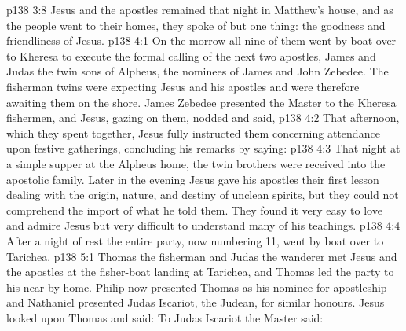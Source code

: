 \vs p138 3:8 Jesus and the apostles remained that night in Matthew’s house, and as the people went to their homes, they spoke of but one thing: the goodness and friendliness of Jesus.
\vs p138 4:1 On the morrow all nine of them went by boat over to Kheresa to execute the formal calling of the next two apostles, James and Judas the twin sons of Alpheus, the nominees of James and John Zebedee. The fisherman twins were expecting Jesus and his apostles and were therefore awaiting them on the shore. James Zebedee presented the Master to the Kheresa fishermen, and Jesus, gazing on them, nodded and said, 
\vs p138 4:2 \pc That afternoon, which they spent together, Jesus fully instructed them concerning attendance upon festive gatherings, concluding his remarks by saying: 
\vs p138 4:3 \pc That night at a simple supper at the Alpheus home, the twin brothers were received into the apostolic family. Later in the evening Jesus gave his apostles their first lesson dealing with the origin, nature, and destiny of unclean spirits, but they could not comprehend the import of what he told them. They found it very easy to love and admire Jesus but very difficult to understand many of his teachings.
\vs p138 4:4 After a night of rest the entire party, now numbering 11, went by boat over to Tarichea.
\vs p138 5:1 Thomas the fisherman and Judas the wanderer met Jesus and the apostles at the fisher\hyp{}boat landing at Tarichea, and Thomas led the party to his near\hyp{}by home. Philip now presented Thomas as his nominee for apostleship and Nathaniel presented Judas Iscariot, the Judean, for similar honours. Jesus looked upon Thomas and said:  To Judas Iscariot the Master said: 
